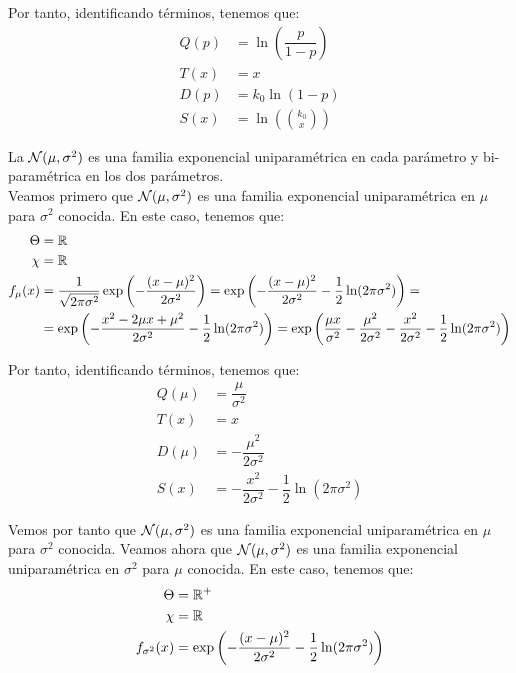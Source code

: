 \begin{ejemplo}
\begin{enumerate}
        Por tanto, identificando términos, tenemos que:
        \begin{align*}
            Q(p) &= \ln\left(\dfrac{p}{1-p}\right) \\
            T(x) &= x \\
            D(p) &= k_0\ln(1-p) \\
            S(x) &= \ln\left(\binom{k_0}{x}\right)
        \end{align*}
    \end{enumerate}
    
\end{ejemplo}


\begin{ejemplo}
    La $\mathcal{N}(\mu, \sigma^2)$ es una familia exponencial uniparamétrica en cada parámetro y bi-paramétrica en los dos parámetros.\\

    Veamos primero que $\mathcal{N}(\mu, \sigma^2)$ es una familia exponencial uniparamétrica en $\mu$ para $\sigma^2$ conocida. En este caso, tenemos que:
    \begin{align*}
        \Theta &= \mathbb{R} \\
        \chi &= \mathbb{R} \\
        f_\mu(x) &= \dfrac{1}{\sqrt{2\pi\sigma^2}} \exp\left(-\dfrac{(x-\mu)^2}{2\sigma^2}\right) = \exp\left(-\dfrac{(x-\mu)^2}{2\sigma^2} - \dfrac{1}{2}\ln(2\pi\sigma^2)\right)
        =\\&= \exp\left(-\dfrac{x^2 - 2\mu x + \mu^2}{2\sigma^2} - \dfrac{1}{2}\ln(2\pi\sigma^2)\right)
        = \exp\left(\dfrac{\mu x}{\sigma^2} - \dfrac{\mu^2}{2\sigma^2} - \dfrac{x^2}{2\sigma^2} - \dfrac{1}{2}\ln(2\pi\sigma^2)\right)
    \end{align*}

    Por tanto, identificando términos, tenemos que:
    \begin{align*}
        Q(\mu) &= \dfrac{\mu}{\sigma^2} \\
        T(x) &= x \\
        D(\mu) &= -\dfrac{\mu^2}{2\sigma^2} \\
        S(x) &= -\dfrac{x^2}{2\sigma^2} - \dfrac{1}{2}\ln(2\pi\sigma^2)
    \end{align*}

    Vemos por tanto que $\mathcal{N}(\mu, \sigma^2)$ es una familia exponencial uniparamétrica en $\mu$ para $\sigma^2$ conocida. Veamos ahora que $\mathcal{N}(\mu, \sigma^2)$ es una familia exponencial uniparamétrica en $\sigma^2$ para $\mu$ conocida. En este caso, tenemos que:
    \begin{align*}
        \Theta &= \mathbb{R}^+ \\
        \chi &= \mathbb{R} \\
        f_{\sigma^2}(x) &= \exp\left(-\dfrac{(x-\mu)^2}{2\sigma^2} - \dfrac{1}{2}\ln(2\pi\sigma^2)\right)
    \end{align*}


\end{ejemplo}
